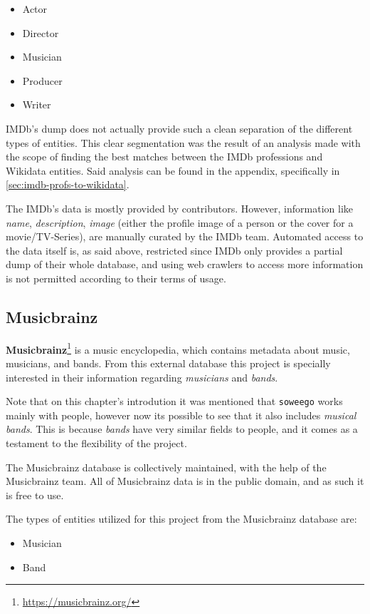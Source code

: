 \documentclass[epsfig,a4paper,11pt,titlepage,twoside,openany]{book}
\newcommand{\footurl}[1]{\footnote{\url{#1}}}
\begin{document}
\begin{itemize}
\item Actor
\item Director
\item Musician
\item Producer
\item Writer
\end{itemize}

IMDb’s dump does not actually provide such a clean separation of the different types of entities. This clear segmentation was the result of an analysis made with the scope of finding the best matches between the IMDb professions and Wikidata entities. Said analysis can be found in the appendix, specifically in \autoref{sec:imdb-profs-to-wikidata}. 

The IMDb’s data is mostly provided by contributors. However, information like \textit{name}, \textit{description}, \textit{image} (either the profile image of a person or the cover for a movie/TV-Series), are manually curated by the IMDb team. Automated access to the data itself is, as said above, restricted since IMDb only provides a partial dump of their whole database, and using web crawlers to access more information is not permitted according to their terms of usage.


\subsection{Musicbrainz}
\label{sec:catalog-musicbrainz}

\textbf{Musicbrainz}\footurl{https://musicbrainz.org/} is a music encyclopedia, which contains metadata about music, musicians, and bands. From this external database this project is specially interested in their information regarding \textit{musicians} and \textit{bands}. 


Note that on this chapter’s introdution it was mentioned that \texttt{soweego} works mainly with people, however now its possible to see that it also includes \textit{musical bands}. This is because \textit{bands} have very similar fields to people, and it comes as a testament to the flexibility of the project.

The Musicbrainz database is collectively maintained, with the help of the Musicbrainz team. All of Musicbrainz data is in the public domain, and as such it is free to use.

The types of entities utilized for this project from the Musicbrainz database are:

\begin{itemize}
\item Musician
\item Band
\end{itemize}
\end{document}
